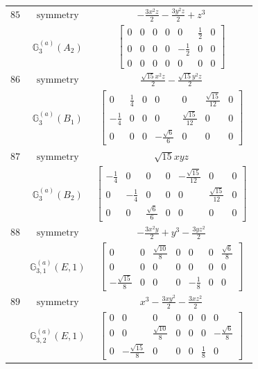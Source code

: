 \documentclass[fleqn,8pt,landscape]{jsarticle}
\begin{document}
\begin{longtable}{ccc}
$ 85 $ & $ \text{symmetry} $ & $ - \frac{3 x^{2} z}{2} - \frac{3 y^{2} z}{2} + z^{3} $ \\
$  $ & $ \mathbb{G}_{3}^{(a)}(A_{2}) $ & $ \begin{bmatrix} 0 & 0 & 0 & 0 & 0 & \frac{1}{2} & 0 \\ 0 & 0 & 0 & 0 & - \frac{1}{2} & 0 & 0 \\ 0 & 0 & 0 & 0 & 0 & 0 & 0 \end{bmatrix} $ \\ \hline
$ 86 $ & $ \text{symmetry} $ & $ \frac{\sqrt{15} x^{2} z}{2} - \frac{\sqrt{15} y^{2} z}{2} $ \\
$  $ & $ \mathbb{G}_{3}^{(a)}(B_{1}) $ & $ \begin{bmatrix} 0 & \frac{1}{4} & 0 & 0 & 0 & \frac{\sqrt{15}}{12} & 0 \\ - \frac{1}{4} & 0 & 0 & 0 & \frac{\sqrt{15}}{12} & 0 & 0 \\ 0 & 0 & 0 & - \frac{\sqrt{6}}{6} & 0 & 0 & 0 \end{bmatrix} $ \\ \hline
$ 87 $ & $ \text{symmetry} $ & $ \sqrt{15} x y z $ \\
$  $ & $ \mathbb{G}_{3}^{(a)}(B_{2}) $ & $ \begin{bmatrix} - \frac{1}{4} & 0 & 0 & 0 & - \frac{\sqrt{15}}{12} & 0 & 0 \\ 0 & - \frac{1}{4} & 0 & 0 & 0 & \frac{\sqrt{15}}{12} & 0 \\ 0 & 0 & \frac{\sqrt{6}}{6} & 0 & 0 & 0 & 0 \end{bmatrix} $ \\ \hline
$ 88 $ & $ \text{symmetry} $ & $ - \frac{3 x^{2} y}{2} + y^{3} - \frac{3 y z^{2}}{2} $ \\
$  $ & $ \mathbb{G}_{3,1}^{(a)}(E,1) $ & $ \begin{bmatrix} 0 & 0 & \frac{\sqrt{10}}{8} & 0 & 0 & 0 & \frac{\sqrt{6}}{8} \\ 0 & 0 & 0 & 0 & 0 & 0 & 0 \\ - \frac{\sqrt{15}}{8} & 0 & 0 & 0 & - \frac{1}{8} & 0 & 0 \end{bmatrix} $ \\ \hline
$ 89 $ & $ \text{symmetry} $ & $ x^{3} - \frac{3 x y^{2}}{2} - \frac{3 x z^{2}}{2} $ \\
$  $ & $ \mathbb{G}_{3,2}^{(a)}(E,1) $ & $ \begin{bmatrix} 0 & 0 & 0 & 0 & 0 & 0 & 0 \\ 0 & 0 & \frac{\sqrt{10}}{8} & 0 & 0 & 0 & - \frac{\sqrt{6}}{8} \\ 0 & - \frac{\sqrt{15}}{8} & 0 & 0 & 0 & \frac{1}{8} & 0 \end{bmatrix} $ \\ \hline

\end{longtable}
\end{document}
